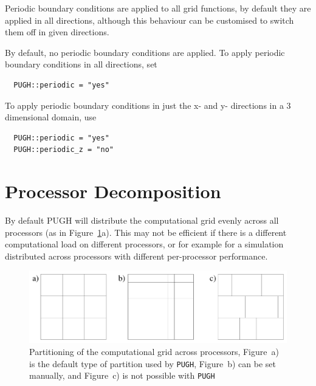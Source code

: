 \documentclass{article}
\begin{document}
Periodic boundary conditions are applied to all grid functions, by default
they are applied in all directions, although this behaviour can be customised
to switch them off in given directions.

By default, no periodic boundary conditions are applied. To apply periodic boundary conditions in all directions, set

\begin{verbatim}
  PUGH::periodic = "yes"
\end{verbatim}

To apply periodic boundary conditions in just the x- and y- directions in
a 3 dimensional domain, use

\begin{verbatim}
  PUGH::periodic = "yes"
  PUGH::periodic_z = "no"
\end{verbatim}


\section{Processor Decomposition}

By default PUGH will distribute the computational grid evenly across
all processors (as in Figure~\ref{pugh::fig2}a). This may not be
efficient if there is a different computational load on different
processors, or for example for a simulation distributed across
processors with different per-processor performance.

\begin{figure}[ht]
\begin{center}
\includegraphics[angle=0,width=12cm]{Partitioning}
\end{center}
\caption[]{Partitioning of the computational grid across processors, Figure~a) is the default type of partition used by {\tt PUGH}, Figure~b) can be set
manually, and Figure~c) is not possible with {\tt PUGH}}
\label{pugh::fig2}
\end{figure}
\end{document}
